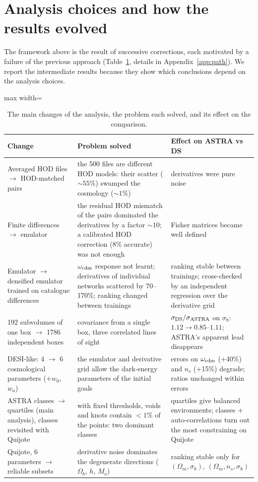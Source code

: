 \section{Analysis choices and how the results evolved}
\label{sec:choices}

The framework above is the result of successive corrections, each motivated by a failure of the previous approach (Table~\ref{tab:evolution}, details in Appendix~\ref{app:path}). We report the intermediate results because they show which conclusions depend on the analysis choices.

\begin{table}[!tp]
\centering\small
\begin{adjustbox}{max width=\textwidth}
\begin{tabular}{p{4.2cm}p{6.3cm}p{6.3cm}}
\toprule
Change & Problem solved & Effect on ASTRA vs DS \\
\midrule
Averaged HOD files $\to$ HOD-matched pairs & the 500 files are different HOD models: their scatter ($\sim55\%$) swamped the cosmology ($\sim1\%$) & derivatives were pure noise \\
Finite differences $\to$ emulator & the residual HOD mismatch of the pairs dominated the derivatives by a factor $\sim10$; a calibrated HOD correction (8\% accurate) was not enough & Fisher matrices became well defined \\
Emulator $\to$ densified emulator trained on catalogue differences & $\omega_{\rm cdm}$ response not learnt; derivatives of individual networks scattered by 70--170\%; ranking changed between trainings & ranking stable between trainings; cross-checked by an independent regression over the derivative grid \\
192 subvolumes of one box $\to$ 1786 independent boxes & covariance from a single box, three correlated lines of sight & $\sigma_{\rm DS}/\sigma_{\rm ASTRA}$ on $\sigma_8$: $1.12\to0.85$--$1.11$; ASTRA's apparent lead disappears \\
DESI-like: 4 $\to$ 6 cosmological parameters ($+w_0$, $w_a$) & the emulator and derivative grid allow the dark-energy parameters of the initial goals & errors on $\omega_{\rm cdm}$ (+40\%) and $n_s$ (+15\%) degrade; ratios unchanged within errors \\
ASTRA classes $\to$ quartiles (main analysis), classes revisited with Quijote & with fixed thresholds, voids and knots contain $<1\%$ of the points: two dominant classes & quartiles give balanced environments; classes + auto-correlations turn out the most constraining on Quijote \\
Quijote, 6 parameters $\to$ reliable subsets & derivative noise dominates the degenerate directions ($\Omega_b$, $h$, $M_\nu$) & ranking stable only for $(\Omega_m,\sigma_8)$, $(\Omega_m,n_s,\sigma_8)$ \\
\bottomrule
\end{tabular}
\end{adjustbox}
\caption{The main changes of the analysis, the problem each solved, and its effect on the comparison.}
\label{tab:evolution}
\end{table}

